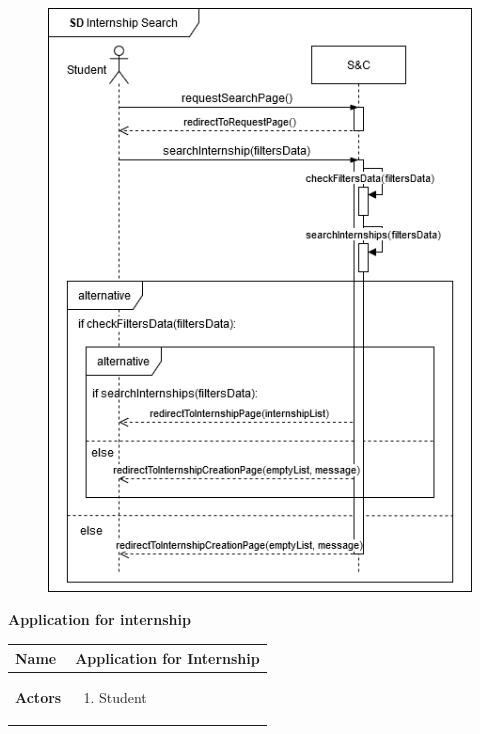 \begin{enumerate}[label=\textbf{[US\arabic*]}, left = 0pt, align = left, resume]
            \newpage        
            \begin{figure}[h!]
                \centering  \includegraphics[width=1\textwidth]{RASD/Images/UseCases/US05_InternshipSearch.drawio.png}
                \label{fig:CompleteStudentProfile}
            \end{figure}
            
            \newpage
            \item \textbf{Application for internship}
            
            \begin{longtable}{|l|p{11cm}|}  
                \hline
                \textbf{Name} & 
                    \textbf{Application for Internship} \\
                \hline
                
                \textbf{Actors} & 
                    \begin{enumerate}[label=\textbullet, itemsep=0em]
                        \item Student
                    \end{enumerate} \\
                \hline
                

\end{longtable}
\end{enumerate}
